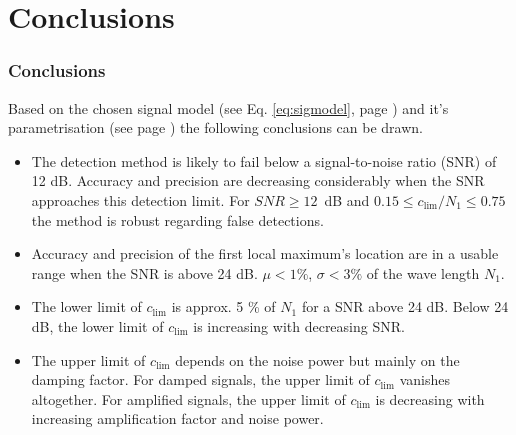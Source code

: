 \documentclass[11pt,aspectratio=169]{beamer}
\begin{document}
	\section{Conclusions}
	\begin{frame}
		\frametitle{Conclusions}
		Based on the chosen signal model (see Eq. \eqref{eq:sigmodel}, page \pageref{eq:sigmodel}) and it's parametrisation (see page \pageref{param:study}) the following conclusions can be drawn.
		\begin{itemize}
			\item The detection method is likely to fail below a signal-to-noise ratio (SNR) of 12 dB. Accuracy and precision are decreasing considerably when the SNR approaches this detection limit. For $SNR \geq 12$~dB and $0.15 \leq c_{\lim} / N_1 \leq 0.75$ the method is robust regarding false detections.
			\item Accuracy and precision of the first local maximum's location are in a usable range when the SNR is above 24 dB. $\mu < 1 \%$, $\sigma < 3 \%$ of the wave length $N_1$.
			\item The lower limit of $c_{\lim}$ is approx. 5 \% of $N_1$ for a SNR above 24 dB. Below 24 dB, the lower limit of $c_{\lim}$ is increasing with decreasing SNR.
			\item The upper limit of $c_{\lim}$ depends on the noise power but mainly on the damping factor. For damped signals, the upper limit of $c_{\lim}$ vanishes altogether. For amplified signals, the upper limit of $c_{\lim}$ is decreasing with increasing amplification factor and noise power.
		\end{itemize}
	\end{frame}
\end{document}
